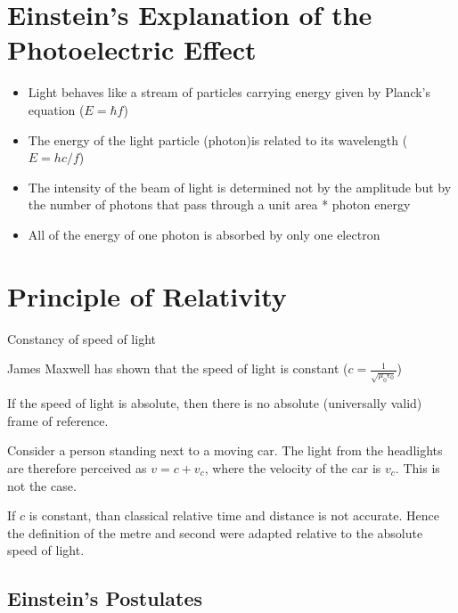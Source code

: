 \section{Einstein's Explanation of the Photoelectric Effect}

	\begin{itemize}
		\item Light behaves like a stream of particles carrying energy given by Planck's equation ($E = \hbar f$)
		\item The energy of the light particle (photon)is related to its wavelength ($E = hc/f$)
		\item The intensity of the beam of light is determined not by the amplitude but by the number of photons that pass through a unit area * photon energy
		\item All of the energy of one photon is absorbed by only one electron
	\end{itemize}

\section{Principle of Relativity}

	Constancy of speed of light

	James Maxwell has shown that the speed of light is constant ($c = \frac{1}{\sqrt{\mu_0 \epsilon _0}}$)

	If the speed of light is absolute, then there is no absolute (universally valid) frame of reference.

	Consider a person standing next to a moving car. The light from the headlights are therefore perceived as $v = c + v_c$, where the velocity of the car is $v_c$. This is not the case.

	If $c$ is constant, than classical relative time and distance is not accurate. Hence the definition of the metre and second were adapted relative to the absolute speed of light.

	\subsection{Einstein's Postulates}
	
